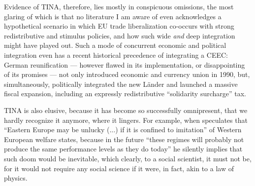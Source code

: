 \documentclass[11pt,a4paper,oneside,openright]{article}
\begin{document}
Evidence of TINA, therefore, lies mostly in conspicuous omissions, the most glaring of which is that no literature I am aware of even acknowledges a hypothetical scenario in which \gls{EU} trade liberalization co-occurs with strong redistributive and stimulus policies, and how such wide \emph{and} deep integration might have played out. 
Such a mode of concurrent economic and political integration even has a recent historical precedence of integrating a \gls{CEEC}: 
German reunification --- however flawed in its implementation, or disappointing of its promises --- not only introduced economic and currency union in 1990, but, simultaneously, politically integrated the new L\"ander and launched a massive fiscal expansion, including an expressly redistributive ``solidarity surcharge'' tax. 

TINA is also elusive, because it has become so successfully omnipresent, that we hardly recognize it anymore, where it lingers. 
For example, when \citeauthor{Kovasc} speculates that ``Eastern Europe may be unlucky (...) if it is confined to imitation'' of Western European welfare states, because in the future ``these regimes will probably not produce the same performance levels as they do today'' he silently implies that such doom would be inevitable, which clearly, to a social scientist, it must not be, for it would not require any social science if it were, in fact, akin to a law of physics.  
\end{document}
